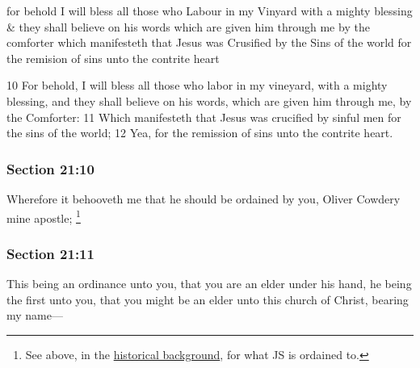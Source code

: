		\begin{framed}
		\scriptsize
			\begin{compactdesc}
				\item[JSP] for behold I will bless all those who Labour in my Vinyard with a mighty blessing \& they shall believe on his words which are given him through me by the comforter which manifesteth that Jesus was Crusified by the Sins of the world for the remision of sins unto the contrite heart
				\item[BC] 10 For behold, I will bless all those who labor in my vineyard, with a mighty blessing, and they shall believe on his words, which are given him through me, by the Comforter: 11 Which manifesteth that Jesus was crucified by sinful men for the sins of the world; 12 Yea, for the remission of sins unto the contrite heart.
			\end{compactdesc}
		\end{framed}

	\subsubsection{Section 21:10} %
		\label{DC21-10}

		Wherefore it behooveth me that he should be ordained by you, Oliver Cowdery mine apostle;%
			\footnote{%
				See above, in the \hyperref[DC21-HB-JSP]{historical background}, for what JS is ordained to.
				}


	\subsubsection{Section 21:11} %
		\label{DC21-11}

		This being an ordinance unto you, that you are an elder under his hand, he being the first unto you, that you might be an elder unto this church of Christ, bearing my name—


